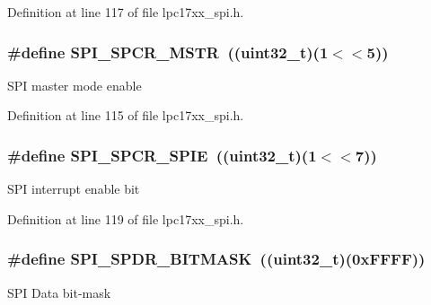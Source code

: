 \-Definition at line 117 of file lpc17xx\-\_\-spi.\-h.

\hypertarget{group___s_p_i___private___macros_gad897a2f6e6f583df0c0c9d849e600104}{
\subsubsection[{\-S\-P\-I\-\_\-\-S\-P\-C\-R\-\_\-\-M\-S\-T\-R}]{\setlength{\rightskip}{0pt plus 5cm}\#define {\bf \-S\-P\-I\-\_\-\-S\-P\-C\-R\-\_\-\-M\-S\-T\-R}~((uint32\-\_\-t)(1$<$$<$5))}}\label{group___s_p_i___private___macros_gad897a2f6e6f583df0c0c9d849e600104}
\-S\-P\-I master mode enable 

\-Definition at line 115 of file lpc17xx\-\_\-spi.\-h.

\hypertarget{group___s_p_i___private___macros_gad6a5a37bcd722f3e3f9c8b719835f54b}{
\subsubsection[{\-S\-P\-I\-\_\-\-S\-P\-C\-R\-\_\-\-S\-P\-I\-E}]{\setlength{\rightskip}{0pt plus 5cm}\#define {\bf \-S\-P\-I\-\_\-\-S\-P\-C\-R\-\_\-\-S\-P\-I\-E}~((uint32\-\_\-t)(1$<$$<$7))}}\label{group___s_p_i___private___macros_gad6a5a37bcd722f3e3f9c8b719835f54b}
\-S\-P\-I interrupt enable bit 

\-Definition at line 119 of file lpc17xx\-\_\-spi.\-h.

\hypertarget{group___s_p_i___private___macros_ga45c6752c75a77a977d9bfaa34fe0e860}{
\subsubsection[{\-S\-P\-I\-\_\-\-S\-P\-D\-R\-\_\-\-B\-I\-T\-M\-A\-S\-K}]{\setlength{\rightskip}{0pt plus 5cm}\#define {\bf \-S\-P\-I\-\_\-\-S\-P\-D\-R\-\_\-\-B\-I\-T\-M\-A\-S\-K}~((uint32\-\_\-t)(0x\-F\-F\-F\-F))}}\label{group___s_p_i___private___macros_ga45c6752c75a77a977d9bfaa34fe0e860}
\-S\-P\-I \-Data bit-\/mask 

